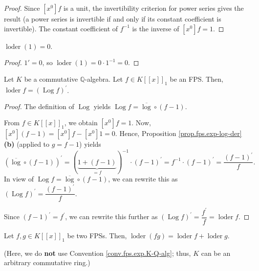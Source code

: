 \begin{proof}
\leanok
Since $[x^0]f$ is a unit, the invertibility criterion for power series
gives the result (a power series is invertible if and only if its constant coefficient is invertible).
The constant coefficient of $f^{-1}$ is the inverse of $[x^0]f = 1$.
\end{proof}

\begin{lemma}[$\operatorname{loder}(1) = 0$]
\label{lem.fps.loder-one}
\leanhelper
\leanok
$\operatorname{loder}(1) = 0$.
\end{lemma}

\begin{proof}
\leanok
$1' = 0$, so $\operatorname{loder}(1) = 0 \cdot 1^{-1} = 0$.
\end{proof}

\begin{proposition}
\label{prop.fps.loder.log}
\leantarget
\leanok
Let $K$ be a commutative $\mathbb{Q}$-algebra. Let
$f\in K\left[\left[x\right]\right]_{1}$ be an FPS. Then,
$\operatorname{loder}f=\left(\operatorname{Log}f\right)^{\prime}$.
\end{proposition}

\begin{proof}
\leanok
The definition of
$\operatorname{Log}$ yields $\operatorname{Log}f=\overline{\log}\circ\left(
f-1\right)$.

From $f\in K\left[\left[x\right]\right]_{1}$, we obtain $\left[
x^{0}\right]f=1$. Now, $\left[x^{0}\right]
\left(f-1\right)=\left[x^{0}\right]f-\left[x^{0}\right]1=0$. Hence, Proposition
\ref{prop.fps.exp-log-der} \textbf{(b)} (applied to $g=f-1$) yields
\[
\left(\overline{\log}\circ\left(f-1\right)\right)^{\prime}=\left(
\underbrace{1+\left(f-1\right)}_{=f}\right)^{-1}\cdot\left(f-1\right)
^{\prime}=f^{-1}\cdot\left(f-1\right)^{\prime}=\dfrac{\left(f-1\right)
^{\prime}}{f}.
\]
In view of $\operatorname{Log}f=\overline{\log}\circ\left(f-1\right)$, we
can rewrite this as
$\left(\operatorname{Log}f\right)^{\prime}=\dfrac{\left(f-1\right)
^{\prime}}{f}$.

Since $\left(f-1\right)^{\prime}=f^{\prime}$, we can rewrite
this further as $\left(\operatorname{Log}f\right)^{\prime}=\dfrac
{f^{\prime}}{f}=\operatorname{loder}f$.
\end{proof}

\begin{proposition}
\label{prop.fps.loder.prod}
\leantarget
\leanok
Let $f,g\in K\left[\left[x\right]\right]
_{1}$ be two FPSs. Then, $\operatorname{loder}\left(fg\right)
=\operatorname{loder}f+\operatorname{loder}g$.

(Here, we do \textbf{not} use Convention \ref{conv.fps.exp.K-Q-alg}; thus, $K$
can be an arbitrary commutative ring.)
\end{proposition}

